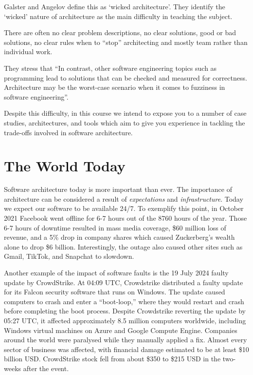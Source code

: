 Galster and Angelov \cite{wicked-architecture} define this as `wicked architecture'.
They identify the `wicked' nature of architecture as the main difficulty in teaching the subject.

\begin{definition}
There are often no clear problem descriptions, no clear solutions, good or bad solutions, no clear rules when to ``stop'' architecting
and mostly team rather than individual work.
\end{definition}

They stress that ``In contrast, other software engineering topics such as programming lead to solutions that can be checked and measured for correctness.
Architecture may be the worst-case scenario when it comes to fuzziness in software engineering''.

Despite this difficulty, in this course we intend to expose you to a number of case studies, architectures,
and tools which aim to give you experience in tackling the trade-offs involved in software architecture.

\section{The World Today}
Software architecture today is more important than ever.
The importance of architecture can be considered a result of \textsl{expectations} and \textsl{infrastructure}.
Today we expect our software to be available 24/7.
To exemplify this point, in October 2021 Facebook went offline for 6-7 hours out of the 8760 hours of the year.
Those 6-7 hours of downtime resulted in mass media coverage, \$60 million loss of revenue,
and a 5\% drop in company shares which caused Zuckerberg's wealth alone to drop \$6 billion.
Interestingly, the outage also caused other sites such as Gmail, TikTok, and Snapchat to slowdown.

Another example of the impact of software faults is the 19 July 2024 faulty update by CrowdStrike.
At 04:09 UTC, Crowdstrike distributed a faulty update for its Falcon security software that runs on Windows.
The update caused computers to crash and enter a ``boot-loop,''
where they would restart and crash before completing the boot process.
Despite Crowdstrike reverting the update by 05:27 UTC,
it affected approximately 8.5 million computers worldwide,
including Windows virtual machines on Azure and Google Compute Engine.
Companies around the world were paralysed while they manually applied a fix.
Almost every sector of business was affected,
with financial damage estimated to be at least \$10 billion USD.
CrowdStrike stock fell from about \$350 to \$215 USD in the two-weeks after the event.

